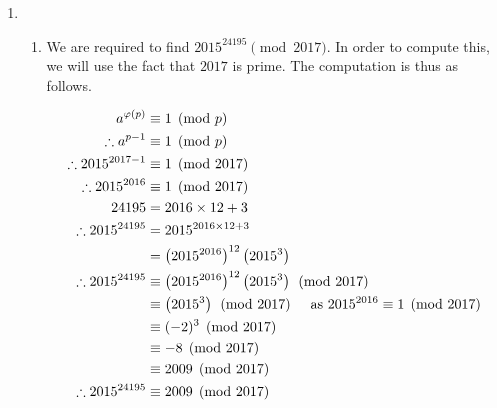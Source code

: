 \documentclass[a4paper]{article}
\begin{document}
\begin{enumerate}
	\item 
	\begin{enumerate}
		\item We are required to find $\displaystyle{2015^{24195} \pmod{2017}}$. In order to compute this, we will use the fact that $\displaystyle{2017}$ is prime. The computation is thus as follows.

		\begin{align*}
		a^{\varphi(p)} &\equiv 1 \pmod{p}\\
		\therefore a^{p-1} &\equiv 1 \pmod{p}\\
		\therefore 2015^{2017-1} &\equiv 1 \pmod{2017}\\
		\therefore 2015^{2016} &\equiv 1 \pmod{2017}\\
		24195 & = 2016\times12 + 3\\
		\therefore 2015^{24195} & = 2015^{2016\times12 + 3}\\
		& = \left(2015^{2016}\right)^{12}\left(2015^{3}\right)\\
		\therefore 2015^{24195} & \equiv \left(2015^{2016}\right)^{12}\left(2015^{3}\right) \pmod{2017}\\
		& \equiv \left(2015^{3}\right) \pmod{2017} \hspace{5mm} \text{as } 2015^{2016} \equiv 1 \pmod{2017}\\
		& \equiv (-2)^3 \pmod{2017}\\
		& \equiv -8 \pmod{2017}\\
		& \equiv 2009 \pmod{2017}\\
		\therefore 2015^{24195} & \equiv 2009 \pmod{2017}\\
		\end{align*}


\end{enumerate}
\end{enumerate}
\end{document}
